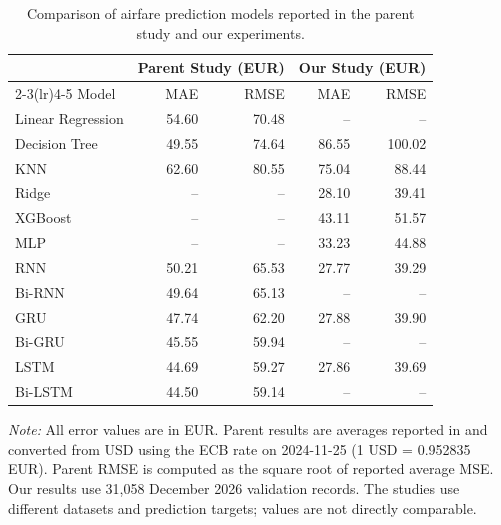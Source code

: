 \begin{table}[t]
\centering
\caption{Comparison of airfare prediction models reported in the parent study and our experiments.}
\label{tab:final_parent_comparison}
\scriptsize
\setlength{\tabcolsep}{3pt}
\begin{tabular}{lrrrr}
\toprule
& \multicolumn{2}{c}{Parent Study (EUR)} & \multicolumn{2}{c}{Our Study (EUR)} \\
\cmidrule(lr){2-3}\cmidrule(lr){4-5}
Model & MAE & RMSE & MAE & RMSE \\
\midrule
Linear Regression & 54.60 & 70.48 & -- & -- \\
Decision Tree & 49.55 & 74.64 & 86.55 & 100.02 \\
KNN & 62.60 & 80.55 & 75.04 & 88.44 \\
Ridge & -- & -- & 28.10 & 39.41 \\
XGBoost & -- & -- & 43.11 & 51.57 \\
MLP & -- & -- & 33.23 & 44.88 \\
RNN & 50.21 & 65.53 & 27.77 & 39.29 \\
Bi-RNN & 49.64 & 65.13 & -- & -- \\
GRU & 47.74 & 62.20 & 27.88 & 39.90 \\
Bi-GRU & 45.55 & 59.94 & -- & -- \\
LSTM & 44.69 & 59.27 & 27.86 & 39.69 \\
Bi-LSTM & 44.50 & 59.14 & -- & -- \\
\bottomrule
\end{tabular}
\vspace{1mm}
\begin{minipage}{\columnwidth}
\footnotesize
\textit{Note:} All error values are in EUR. Parent results are averages reported in \cite{meepaganithage_airfare} and converted from USD using the ECB rate on 2024-11-25 (1 USD = 0.952835 EUR). Parent RMSE is computed as the square root of reported average MSE. Our results use 31,058 December 2026 validation records. The studies use different datasets and prediction targets; values are not directly comparable.
\end{minipage}
\end{table}